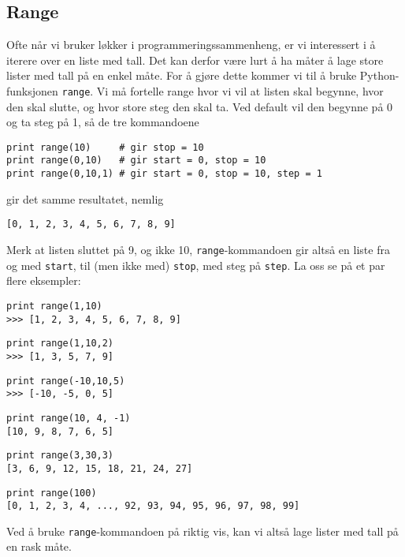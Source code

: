 \documentclass[a4paper, 11pt, notitlepage]{article}
\begin{document}
\subsection{Range}
Ofte når vi bruker løkker i programmeringssammenheng, er vi interessert i å iterere over en liste med tall. Det kan derfor være lurt å ha måter å lage store lister med tall på en enkel måte. For å gjøre dette kommer vi til å bruke Python-funksjonen \verb+range+. Vi må fortelle range hvor vi vil at listen skal begynne, hvor den skal slutte, og hvor store steg den skal ta. Ved default vil den begynne på 0 og ta steg på 1, så de tre kommandoene
\begin{lstlisting}
print range(10)     # gir stop = 10
print range(0,10)   # gir start = 0, stop = 10
print range(0,10,1) # gir start = 0, stop = 10, step = 1
\end{lstlisting}
\vspace{-0.3cm}
gir det samme resultatet, nemlig
\begin{lstlisting}
[0, 1, 2, 3, 4, 5, 6, 7, 8, 9]
\end{lstlisting}
\vspace{-0.3cm}
Merk at listen sluttet på 9, og ikke 10, \verb+range+-kommandoen gir altså en liste fra og med \verb+start+, til (men ikke med) \verb+stop+, med steg på \verb+step+. La oss se på et par flere eksempler:
\begin{lstlisting}
print range(1,10)
>>> [1, 2, 3, 4, 5, 6, 7, 8, 9]
\end{lstlisting}
\vspace{-0.3cm}
\begin{lstlisting}
print range(1,10,2)
>>> [1, 3, 5, 7, 9]
\end{lstlisting}
\vspace{-0.3cm}
\begin{lstlisting}
print range(-10,10,5)
>>> [-10, -5, 0, 5]
\end{lstlisting}
\vspace{-0.3cm}
\begin{lstlisting}
print range(10, 4, -1)
[10, 9, 8, 7, 6, 5]
\end{lstlisting}
\vspace{-0.3cm}
\begin{lstlisting}
print range(3,30,3)
[3, 6, 9, 12, 15, 18, 21, 24, 27]
\end{lstlisting}
\vspace{-0.3cm}
\begin{lstlisting}
print range(100)
[0, 1, 2, 3, 4, ..., 92, 93, 94, 95, 96, 97, 98, 99]
\end{lstlisting}
\vspace{-0.3cm}
Ved å bruke \verb+range+-kommandoen på riktig vis, kan vi altså lage lister med tall på en rask måte.
\end{document}
